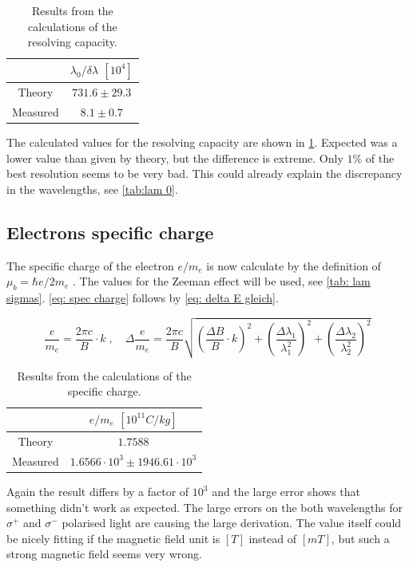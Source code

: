 \documentclass[]{article}
\begin{document}
\begin{table}[H]
\centering
\begin{tabular}{c|c}
&$\lambda_0/\delta\lambda$ $[10^4]$\\ \hline\hline
Theory & $731.6 \pm 29.3$    \\ \hline
Measured & $8.1 \pm 0.7$  
\end{tabular}
\caption{Results from the calculations of the resolving capacity.}
\label{tab: res cap results}
\end{table}

The calculated values for the resolving capacity are shown in \ref{tab: res cap results}. Expected was a lower value than given by theory, but the difference is extreme. Only $1\%$ of the best resolution seems to be very bad. This could already explain the discrepancy in the wavelengths, see \autoref{tab:lam 0}.


\subsection{Electrons specific charge}
The specific charge of the electron $e/m_e$ is now calculate by the definition of $\mu_b = \hbar e/2m_e$ . The values for the Zeeman effect will be used, see \autoref{tab: lam sigmas}. \autoref{eq: spec charge} follows by \autoref{eq: delta E gleich}.

\begin{equation}
\frac{e}{m_e} = \frac{2\pi c}{B} \cdot k \;,\quad \Delta \frac{e}{m_e} = \frac{2\pi c}{B} \sqrt{\left(\frac{\Delta B}{B}\cdot k \right)^2 + \left(\frac{\Delta\lambda_1}{\lambda_1^2}\right)^2 + \left(\frac{\Delta\lambda_2}{\lambda_2^2}\right)^2 }
\label{eq: spec charge}
\end{equation}

\begin{table}[H]
\centering
\begin{tabular}{c|c}
&$e/m_e$ $[10^{11} C/kg]$\\ \hline\hline
Theory & $ 1.7588 $    \\ \hline
Measured & $1.6566 \cdot 10^3 \pm 1946.61 \cdot 10^3 $  
\end{tabular}
\caption{Results from the calculations of the specific charge.}
\label{tab: e/me results}
\end{table}

Again the result differs by a factor of $10^3$ and the large error shows that something didn't work as expected. The large errors on the both wavelengths for $\sigma^+$ and $\sigma^-$ polarised light are causing the large derivation. The value itself could be nicely fitting if the magnetic field unit is $[T]$ instead of $[mT]$, but such a strong magnetic field seems very wrong.
\end{document}
